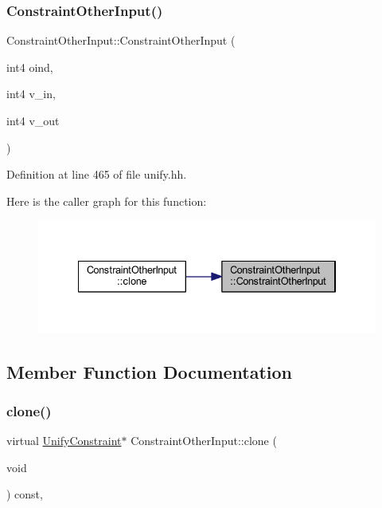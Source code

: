 \subsubsection{\texorpdfstring{ConstraintOtherInput()}{ConstraintOtherInput()}}
{\footnotesize\ttfamily Constraint\+Other\+Input\+::\+Constraint\+Other\+Input (\begin{DoxyParamCaption}\item[{int4}]{oind,  }\item[{int4}]{v\+\_\+in,  }\item[{int4}]{v\+\_\+out }\end{DoxyParamCaption})\hspace{0.3cm}{\ttfamily [inline]}}



Definition at line 465 of file unify.\+hh.

Here is the caller graph for this function\+:
\nopagebreak
\begin{figure}[H]
\begin{center}
\leavevmode
\includegraphics[width=334pt]{class_constraint_other_input_aa44c934b83c2b1b42da742034cd6d88e_icgraph}
\end{center}
\end{figure}


\subsection{Member Function Documentation}
\mbox{\label{class_constraint_other_input_ab28910fd3c39f0badcb49a91685a732e}} 
\subsubsection{\texorpdfstring{clone()}{clone()}}
{\footnotesize\ttfamily virtual \mbox{\hyperlink{class_unify_constraint}{Unify\+Constraint}}$\ast$ Constraint\+Other\+Input\+::clone (\begin{DoxyParamCaption}\item[{void}]{ }\end{DoxyParamCaption}) const\hspace{0.3cm}{\ttfamily [inline]}, {\ttfamily [virtual]}}



